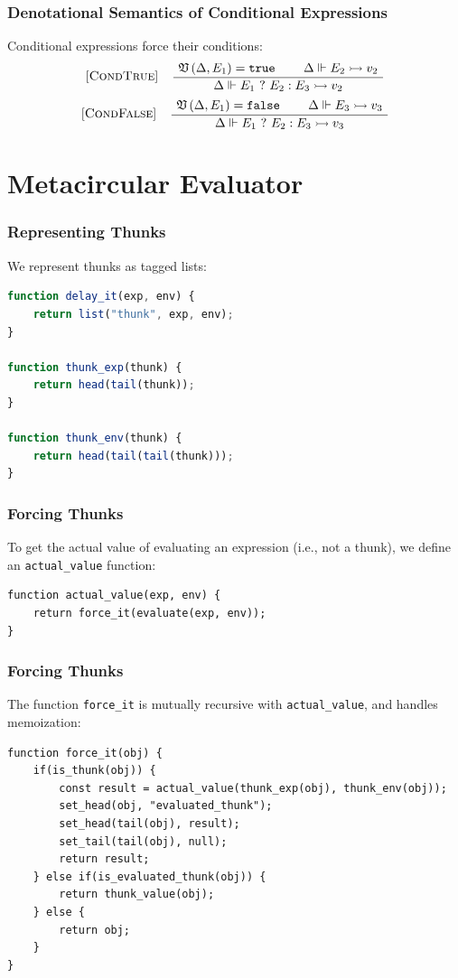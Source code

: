 \documentclass[12pt]{beamer}
\makeatletter
\newenvironment{boxedprooftree}[1][c]
 {\begin{tabular}[#1]{@{}c@{}}}
 {\DisplayProof\end{tabular}}
\makeatother
\begin{document}
\begin{frame}
\frametitle{Denotational Semantics of Conditional Expressions}
Conditional expressions force their conditions:
\[
\begin{tabular}{@{} l c @{}}
[\textsc{CondTrue}] &
  \begin{boxedprooftree}
  \AxiomC{$\tforce{\Delta}{E_1}=\texttt{true}$}
  \AxiomC{$\Delta\Vdash E_2\rightarrowtail v_2$}
  \BinaryInfC{$\Delta\Vdash E_1\text{ }?\text{ }E_2 : E_3\rightarrowtail v_2$}
  \end{boxedprooftree}
\end{tabular}
\]
\[
\begin{tabular}{@{} l c @{}}
[\textsc{CondFalse}] &
  \begin{boxedprooftree}
  \AxiomC{$\tforce{\Delta}{E_1}=\texttt{false}$}
  \AxiomC{$\Delta\Vdash E_3\rightarrowtail v_3$}
  \BinaryInfC{$\Delta\Vdash E_1\text{ }?\text{ }E_2 : E_3\rightarrowtail v_3$}
  \end{boxedprooftree}
\end{tabular}
\]
\end{frame}

\section{Metacircular Evaluator}
\begin{frame}[fragile]
\frametitle{Representing Thunks}
We represent thunks as tagged lists:
\begin{lstlisting}[language=JavaScript]
function delay_it(exp, env) {
    return list("thunk", exp, env);
}

function thunk_exp(thunk) {
    return head(tail(thunk));
}

function thunk_env(thunk) {
    return head(tail(tail(thunk)));
}
\end{lstlisting}
\end{frame}

\begin{frame}[fragile]
\frametitle{Forcing Thunks}
To get the actual value of evaluating an expression (i.e., not a thunk), we define an \texttt{actual\_value} function:
\begin{lstlisting}
function actual_value(exp, env) {
    return force_it(evaluate(exp, env));
}
\end{lstlisting}
\end{frame}

\begin{frame}[fragile]
\frametitle{Forcing Thunks}
The function \texttt{force\_it} is mutually recursive with \texttt{actual\_value}, and handles memoization:
\begin{lstlisting}
function force_it(obj) {
    if(is_thunk(obj)) {        
        const result = actual_value(thunk_exp(obj), thunk_env(obj));        
        set_head(obj, "evaluated_thunk");
        set_head(tail(obj), result);
        set_tail(tail(obj), null);        
        return result;        
    } else if(is_evaluated_thunk(obj)) {        
        return thunk_value(obj);        
    } else {
        return obj;
    }    
}
\end{lstlisting}
\end{frame}
\end{document}
